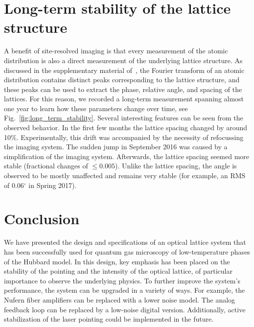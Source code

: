 \documentclass[twocolumn,aps,pra,showpacs,preprintnumbers,bibnotes]{revtex4-1}
\begin{document}
\section{Long-term stability of the lattice structure}
A benefit of site-resolved imaging is that every measurement of the atomic distribution is also a direct measurement of the underlying lattice structure.
As discussed in the supplementary material of~\cite{Parsons2016, Greif2016}, the Fourier transform of an atomic distribution contains distinct peaks corresponding to the lattice structure, and these peaks can be used to extract the phase, relative angle, and spacing of the lattices.
For this reason, we recorded a long-term measurement spanning almost one year to learn how these parameters change over time, see Fig.~\ref{fig:long_term_stability}.
Several interesting features can be seen from the observed behavior. In the first few months the lattice spacing changed by around 10\%. Experimentally, this drift was accompanied by the necessity of refocussing the imaging system. The sudden jump in September 2016 was caused by a simplification of the imaging system. Afterwards, the lattice spacing seemed more stable (fractional changes of $\leq 0.005$). Unlike the lattice spacing, the angle is observed to be mostly unaffected and remains very stable (for example, an RMS of 0.06$^\circ$ in Spring 2017).

\section{Conclusion}
We have presented the design and specifications of an optical lattice system that has been successfully used for quantum gas microscopy of low-temperature phases of the Hubbard model.
In this design, key emphasis has been placed on the stability of the pointing and the intensity of the optical lattice, of particular importance to observe the underlying physics.
To further improve the system's performance, the system can be upgraded in a variety of ways. For example, the Nufern fiber amplifiers can be replaced with a lower noise model. The analog feedback loop can be replaced by a low-noise digital version. Additionally, active stabilization of the laser pointing could be implemented in the future.


\end{document}
